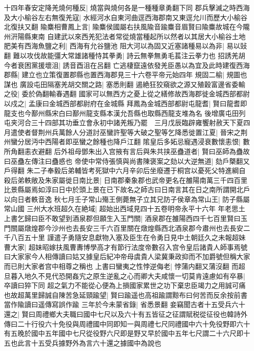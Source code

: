 十四年春安定降羌燒何種反|{
	燒當與燒何各是一種種章勇翻下同}
郡兵擊滅之時西海及大小榆谷左右無復羌寇|{
	水經河水自東河曲逕西海郡南又東逕允川而歷大小榆谷北復扶又翻}
隃麋相曹鳳上言|{
	隃麋侯國屬右扶風隃音踰麋音眉賢曰隃麋故城在今隴州汧陽縣東南}
自建武以來西羌犯法者常從燒當種起所以然者以其居大小榆谷土地肥美有西海魚鹽之利|{
	西海有允谷鹽池}
阻大河以為固又近塞諸種易以為非|{
	易以䜴翻}
難以攻伐故能彊大常雄諸種恃其拳勇|{
	詩云無拳無勇毛萇注云拳力也}
招誘羌胡今者衰困黨援壞沮|{
	誘音酉沮在呂翻}
亡逃棲竄遠依發羌臣愚以為宜及此時建復西海郡縣|{
	建立也立策復置郡縣也置西海郡見三十六卷平帝元始四年}
規固二榆|{
	規圖也謀也}
廣設屯田隔塞羌胡交關之路|{
	塞悉則翻}
遏絶狂狡窺欲之源又殖穀富邊省委輸之役|{
	委於偽翻輸春遇翻}
國家可以無西方之憂上從之繕修故西海郡徙金城西部都尉以戍之|{
	孟康曰金城西部都尉府在金城縣}
拜鳳為金城西部都尉屯龍耆|{
	賢曰龍耆即龍支也今鄯州縣宋白曰鄯州龍支縣本漢允吾縣也取縣西龍支堆為名}
後增廣屯田列屯夹河合三十四部其功垂立會永初中諸羌叛乃罷　三月戊辰臨辟雍饗射赦天下夏四月遣使者督荆州兵萬餘人分道討巫蠻許聖等大破之聖等乞降悉徙置江夏|{
	晉宋之荆州蠻分居沔中西陽者即巫蠻之餘種也降戶江翻}
隂皇后多妬忌寵遇浸衰數懷恚恨|{
	數所角翻恚衣避翻}
后外祖母鄧朱出入宫掖有言后與朱共挟巫蠱道者|{
	賢曰巫師為蠱故曰巫蠱左傳注曰蠱惑也}
帝使中常侍張慎與尚書陳褒案之劾以大逆無道|{
	劾戶槩翻又戶得翻}
朱二子奉毅后弟輔皆考死獄中六月辛卯后坐廢遷于桐宫以憂死父特進綱自殺后弟軼敞及朱家屬徙日南比景|{
	日南郡秦象郡也武帝更名在雒陽南萬三千四百里比景縣屬焉如淳曰日中於頭上景在已下故名之師古曰日南言其在日之南所謂開北戶以向日者軼音逸}
秋七月壬子常山殤王側薨無子立其兄防子侯章為常山王|{
	防子縣屬常山國}
三州大水班超久在絶域|{
	超始出西域見四十五卷明帝永平十六年}
年老思土上書乞歸曰臣不敢望到酒泉郡但願生入玉門關|{
	酒泉郡在雒陽西四千七百里賢曰玉門關屬燉煌郡今沙州也去長安三千六百里關在燉煌縣西北酒泉郡今肅州也去長安二千八百五十里}
謹遣子勇隨安息獻物入塞及臣生在令勇日見中土朝廷久之未報超妹曹大家|{
	超妹昭嫁扶風曹夀博學高才有節行法度帝數召入宫令皇后諸貴人師事焉號曰大家家今人相傳讀曰姑又據皇后紀冲帝母虞貴人梁冀秉政抑而不加爵號但稱大家而已則大家者宫中相尊之稱也}
上書曰蠻夷之性悖逆侮老|{
	悖蒲内翻又蒲沒翻}
而超旦暮入地久不見代恐開姦宄之原生逆亂之心而卿大夫咸懷一切莫肯遠慮如有卒暴|{
	卒讀曰猝下同}
超之氣力不能從心便為上損國家累世之功下棄忠臣竭力之用誠可痛也故超萬里歸誠自陳苦急延頸踰望|{
	賢曰踰遥也高祖踰謂黥布曰何苦而反余按前書當作隃讀曰遥傳寫誤作踰}
三年於今未蒙省錄|{
	省悉景翻}
妾竊聞古者十五受兵六十還之|{
	賢曰周禮鄉大夫職曰國中七尺以及六十有五皆征之征謂賦税從征役也韓詩外傳曰二十行役六十免役與周禮國中同即知一與周禮七尺同禮國中六十免役野即六十有五晚於國中五年國中七尺從役野六尺即是野又早於國中五年七尺謂二十六尺即十五也此言十五受兵據野外為言六十還之據國中為說也}
